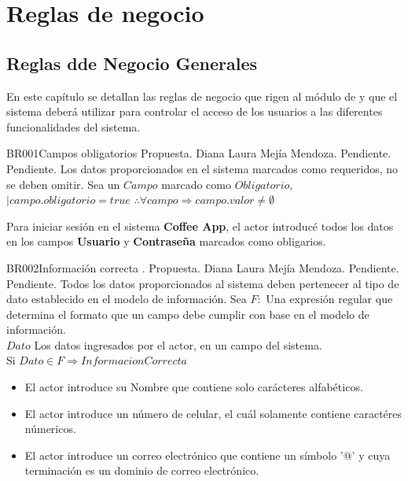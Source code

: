 
\section{Reglas de negocio}

\subsection{Reglas dde Negocio Generales}

En este capítulo se detallan las reglas de negocio que rigen al módulo de \varModulo y que el sistema deberá utilizar para controlar el acceso de los usuarios a las diferentes funcionalidades del sistema.

\begin{BusinessRule}{BR001}{Campos obligatorios}{}{}{}
	\BRItem[Estado] Propuesta.
	 Diana Laura Mejía Mendoza.
	 Pendiente.
	 Pendiente.
	\BRItem[Descripción] Los datos proporcionados en el sistema marcados como requeridos, no se deben omitir.
	\BRItem[Sentencia] Sea un $Campo$ marcado como $Obligatorio$, $ |  campo.obligatorio = true$ 
	$ \therefore \forall campo \Rightarrow campo.valor \neq \emptyset $

	\BRItem[Ejemplo] Para iniciar sesión en el sistema \textbf{Coffee App}, el actor introducé todos los datos en los campos \textbf{Usuario} y \textbf{Contraseña} marcados como obligarios. 

\end{BusinessRule}


\begin{BusinessRule}{BR002}{Información correcta}{}{}{}
	.
	\BRItem[Estado] Propuesta.
	 Diana Laura Mejía Mendoza.
	 Pendiente.
	 Pendiente.
	\BRItem[Descripción] Todos los datos proporcionados al sistema deben pertenecer al tipo de dato establecido en el modelo de información.
	\BRItem[Sentencia] Sea $F:$ Una expresión regular que determina el formato que un campo debe cumplir con base en el modelo de información. \\ $Dato$ Los datos ingresados por el actor, en un campo del sistema.\\
	
	Si $ Dato \in F \Longrightarrow InformacionCorrecta $
	\BRItem[Ejemplos]
		\begin{itemize}
			\item El actor introduce su Nombre que contiene solo carácteres alfabéticos.
			\item El actor introduce un número de celular, el cuál solamente contiene caractéres númericos.
			\item El actor introduce un correo electrónico que contiene un símbolo '@' y cuya terminación es un dominio de correo electrónico.
		\end{itemize}

\end{BusinessRule}

